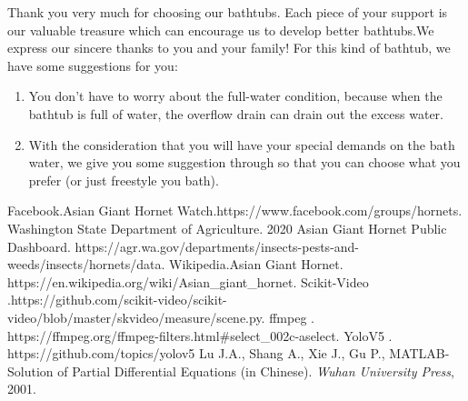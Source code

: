 \documentclass[12pt]{article}
\begin{document}
	Thank you very much for choosing our bathtubs. Each piece of your support is our valuable treasure
	which can encourage us to develop better bathtubs.We express our sincere thanks to you and your
	family!
	For this kind of bathtub, we have some suggestions for you:
	\begin{enumerate}[\bf 1.]
		\item You don't have to worry about the full-water condition, because when the bathtub is full
		of water, the overflow drain can drain out the excess water.
		\item With the consideration that you will have your special demands on the bath water, we give
		you some suggestion through so that you can choose what you prefer
		(or just freestyle you bath).
		
	\end{enumerate}
\clearpage
\begin{thebibliography}{99}
	Facebook.Asian Giant Hornet Watch.https://www.facebook.com/groups/hornets.
	Washington State Department of Agriculture. 2020 Asian Giant Hornet Public 
	Dashboard. https://agr.wa.gov/departments/insects-pests-and-weeds/insects/hornets/data.
	Wikipedia.Asian Giant Hornet. https://en.wikipedia.org/wiki/Asian\_giant\_hornet.
	Scikit-Video .https://github.com/scikit-video/scikit-video/blob/master/skvideo/measure/scene.py.
	ffmpeg . https://ffmpeg.org/ffmpeg-filters.html\#select\_002c-aselect.
	YoloV5 . https://github.com/topics/yolov5
	Lu J.A., Shang A., Xie J., Gu P., MATLAB-Solution of Partial Differential Equations (in
	Chinese). \emph{Wuhan University Press}, 2001.

\end{thebibliography}

\clearpage
\end{document}
